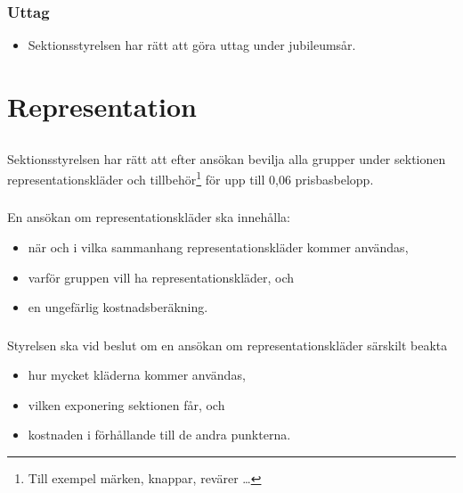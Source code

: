 \documentclass[a4paper, 10pt]{article}
\begin{document}
\subsubsection{Uttag}
\begin{itemize}
  \item Sektionsstyrelsen har rätt att göra uttag under jubileumsår.
\end{itemize}

\section{Representation}
\subsection{}
Sektionsstyrelsen har rätt att efter ansökan bevilja alla grupper under
sektionen representationskläder och tillbehör\footnote{Till exempel märken,
knappar, revärer \dots} för upp till 0,06 prisbasbelopp.

\subsubsection{}
En ansökan om representationskläder ska innehålla:
\begin{itemize}
  \item när och i vilka sammanhang representationskläder kommer användas,
  \item varför gruppen vill ha representationskläder, och
  \item en ungefärlig kostnadsberäkning.
\end{itemize}
\subsubsection{}
Styrelsen ska vid beslut om en ansökan om representationskläder särskilt beakta
\begin{itemize}
  \item hur mycket kläderna kommer användas,
  \item vilken exponering sektionen får, och
  \item kostnaden i förhållande till de andra punkterna.
\end{itemize}
\end{document}
